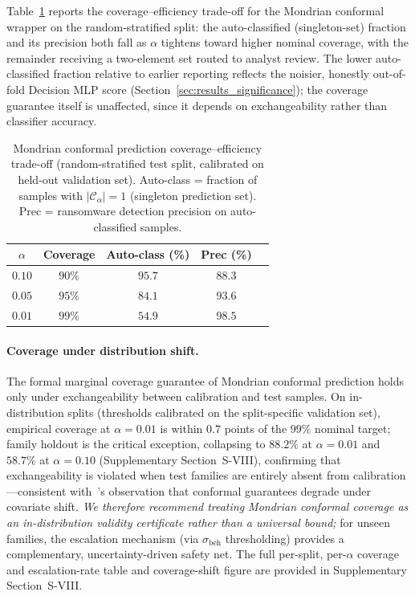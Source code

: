 \documentclass[journal]{IEEEtran}
\begin{document}
Table~\ref{tab:conformal} reports the coverage--efficiency trade-off for
the Mondrian conformal wrapper on the random-stratified split: the
auto-classified (singleton-set) fraction and its precision both fall as
$\alpha$ tightens toward higher nominal coverage, with the remainder
receiving a two-element set routed to analyst review. The lower
auto-classified fraction relative to earlier reporting reflects the
noisier, honestly out-of-fold Decision MLP score
(Section~\ref{sec:results_significance}); the coverage guarantee itself
is unaffected, since it depends on exchangeability rather than
classifier accuracy.

\begin{table}[t]
\centering
\footnotesize
\caption{Mondrian conformal prediction coverage--efficiency trade-off
  (random-stratified test split, calibrated on held-out validation set).
  Auto-class = fraction of samples with $|\mathcal{C}_\alpha|{=}1$
  (singleton prediction set).
  Prec = ransomware detection precision on auto-classified samples.
}
\label{tab:conformal}
\setlength{\tabcolsep}{5pt}
\begin{tabular}{ccccc}
\toprule
$\alpha$ & Coverage & Auto-class (\%) & Prec (\%) \\
\midrule
$0.10$ & $90\%$ & $95.7$ & $88.3$ \\
$0.05$ & $95\%$ & $84.1$ & $93.6$ \\
$0.01$ & $99\%$ & $54.9$ & $98.5$ \\
\bottomrule
\end{tabular}
\end{table}

\paragraph{Coverage under distribution shift.}
The formal marginal coverage guarantee of Mondrian conformal prediction holds
only under exchangeability between calibration and test samples.
On in-distribution splits (thresholds calibrated on the split-specific
validation set), empirical coverage at $\alpha{=}0.01$ is within
$0.7$ points of the $99\%$ nominal target; family holdout is the critical
exception, collapsing to $\mathbf{88.2\%}$ at $\alpha{=}0.01$ and $58.7\%$
at $\alpha{=}0.10$ (Supplementary Section~S-VIII), confirming that
exchangeability is violated when test families are entirely absent from
calibration---consistent
with~\cite{angelopoulos_conformal_risk_2022}'s observation that conformal
guarantees degrade under covariate shift.
\emph{We therefore recommend treating Mondrian conformal coverage as an
in-distribution validity certificate rather than a universal bound;} for
unseen families, the escalation mechanism (via $\sigma_{\text{beh}}$
thresholding) provides a complementary, uncertainty-driven safety net.
The full per-split, per-$\alpha$ coverage and escalation-rate table and
coverage-shift figure are provided in Supplementary Section~S-VIII.
\end{document}
